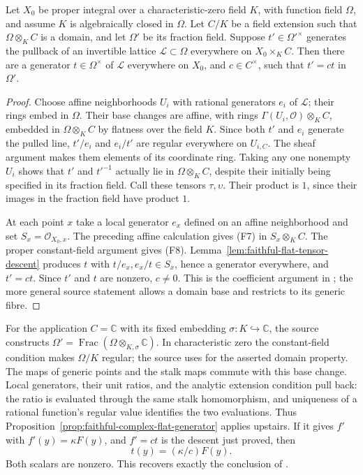 \begin{srproposition}
\label{prop:faithful-flat-generator-descent}
Let \(X_0\) be proper integral over a characteristic-zero field \(K\),
with function field \(\Omega\), and assume \(K\) is algebraically
closed in \(\Omega\).
Let \(C/K\) be a field extension such that \(\Omega\otimes_K C\)
is a domain, and let \(\Omega'\) be its fraction field.
Suppose \(t'\in\Omega'^\times\) generates the pullback of an
invertible lattice \(\mathcal L\subset\Omega\) everywhere on
\(X_0\times_K C\).
Then there are a generator \(t\in\Omega^\times\) of
\(\mathcal L\) everywhere on \(X_0\), and \(c\in C^\times\),
such that \(t'=ct\) in \(\Omega'\).
\end{srproposition}
\begin{proof}
Choose affine neighborhoods \(U_i\) with rational generators \(e_i\)
of \(\mathcal L\); their rings embed in \(\Omega\).
Their base changes are affine, with rings
\(\Gamma(U_i,\mathcal O)\otimes_K C\), embedded in
\(\Omega\otimes_K C\) by flatness over the field \(K\).
Since both \(t'\) and \(e_i\) generate the pulled line,
\(t'/e_i\) and \(e_i/t'\) are regular everywhere on \(U_{i,C}\).
The sheaf argument makes them elements of its coordinate ring.
Taking any one nonempty \(U_i\) shows that \(t'\) and \(t'^{-1}\)
actually lie in \(\Omega\otimes_K C\), despite their initially
being specified in its fraction field.
Call these tensors \(\tau,\upsilon\).
Their product is \(1\), since their images in the fraction field
have product \(1\).

At each point \(x\) take a local generator \(e_x\) defined on an
affine neighborhood and set \(S_x=\mathcal O_{X_0,x}\).
The preceding affine calculation gives (F7) in
\(S_x\otimes_K C\).  The proper constant-field argument gives
(F8).  Lemma~\ref{lem:faithful-flat-tensor-descent} produces
\(t\) with \(t/e_x,e_x/t\in S_x\), hence a generator everywhere,
and \(t'=ct\).
Since \(t'\) and \(t\) are nonzero, \(c\ne0\).
This is the coefficient argument in
;
the more general source statement allows a domain base
and restricts to its generic fibre.
\end{proof}

For the application \(C=\mathbb C\) with its fixed embedding
\(\sigma:K\hookrightarrow\mathbb C\), the source constructs
\(\Omega'=\operatorname{Frac}(\Omega\otimes_{K,\sigma}\mathbb C)\).
In characteristic zero the constant-field condition makes
\(\Omega/K\) regular; the source uses
 for the asserted domain
property.  The maps of generic points and the stalk maps commute
with this base change.
Local generators, their unit ratios, and the analytic extension
condition pull back: the ratio is evaluated through the same
stalk homomorphism, and uniqueness of a rational function's
regular value identifies the two evaluations.
Thus Proposition~\ref{prop:faithful-complex-flat-generator}
applies upstairs.
If it gives \(f'\) with \(f'(y)=\kappa F(y)\), and
\(f'=ct\) is the descent just proved, then
\[
                           t(y)=(\kappa/c)F(y).
 \tag{F11}\label{eq:faithful-flat-generator-scalar}
\]
Both scalars are nonzero.  This recovers exactly the conclusion
of .

